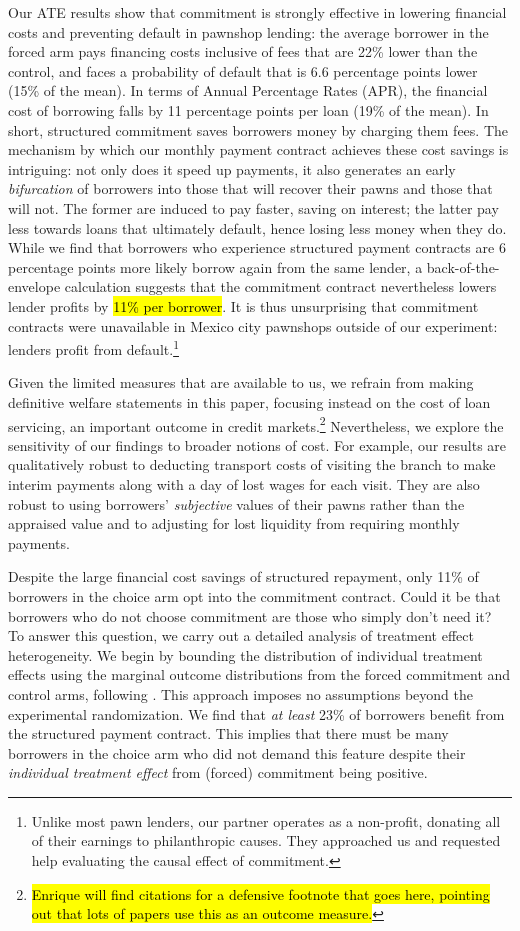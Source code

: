 \documentclass[12pt, a4paper]{article}
\begin{document}
Our ATE results show that commitment is strongly effective in lowering financial costs and preventing default in pawnshop lending: the average borrower in the forced arm pays financing costs inclusive of fees that are 22\% lower than the control, and faces a probability of default that is 6.6 percentage points lower (15\% of the mean). In terms of Annual Percentage Rates (APR), the financial cost of borrowing falls by 11 percentage points per loan (19\% of the mean). In short, structured commitment saves borrowers money by charging them fees. The mechanism by which our monthly payment contract achieves these cost savings is intriguing: not only does it speed up payments, it also generates an early \emph{bifurcation} of borrowers into those that will recover their pawns and those that will not. The former are induced to pay faster, saving on interest; the latter pay less towards loans that ultimately default, hence losing less money when they do. While we find that borrowers who experience structured payment contracts are 6 percentage points more likely borrow again from the same lender, a back-of-the-envelope calculation suggests that the commitment contract nevertheless lowers lender profits by \hl{11\% per borrower}. It is thus unsurprising that commitment contracts were unavailable in Mexico city pawnshops outside of our experiment: lenders profit from default.\footnote{Unlike most pawn lenders, our partner operates as a non-profit, donating all of their earnings to philanthropic causes. They approached us and requested help evaluating the causal effect of commitment.}

Given the limited measures that are available to us, we refrain from making definitive welfare statements in this paper, focusing instead on the cost of loan servicing, an important outcome in credit markets.\footnote{\hl{Enrique will find citations for a defensive footnote that goes here, pointing out that lots of papers use this as an outcome measure.}} Nevertheless, we explore the sensitivity of our findings to broader notions of cost. For example, our results are qualitatively robust to deducting transport costs of visiting the branch to make interim payments along with a day of lost wages for each visit. They are also robust to using borrowers' \emph{subjective} values of their pawns rather than the appraised value and to adjusting for lost liquidity from requiring monthly payments.  


Despite the large financial cost savings of structured repayment, only 11\% of borrowers in the choice arm opt into the commitment contract. 
Could it be that borrowers who do not choose commitment are those who simply don't need it? 
To answer this question, we carry out a detailed analysis of treatment effect heterogeneity.
We begin by bounding the distribution of individual treatment effects using the marginal outcome distributions from the forced commitment and control arms, following \cite{fan2010sharp}. This approach imposes no assumptions beyond the experimental randomization. We find that \emph{at least} 23\% of borrowers benefit from the structured payment contract. This implies that there must be many borrowers in the choice arm who did not demand this feature despite their \emph{individual treatment effect} from (forced) commitment being positive. 
\end{document}
